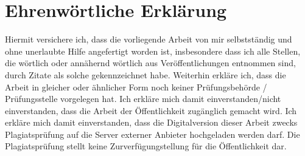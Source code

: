 \section*{Ehrenwörtliche Erklärung}
\thispagestyle{empty}

Hiermit versichere ich, dass die vorliegende Arbeit von mir selbstständig und
ohne unerlaubte Hilfe angefertigt worden ist, insbesondere dass ich alle Stellen, die wörtlich oder annähernd wörtlich aus Veröffentlichungen entnommen
sind, durch Zitate als solche gekennzeichnet habe. Weiterhin erkläre ich,
dass die Arbeit in gleicher oder ähnlicher Form noch keiner Prüfungsbehörde
/ Prüfungsstelle vorgelegen hat. Ich erkläre mich damit einverstanden/nicht
einverstanden, dass die Arbeit der Öffentlichkeit zugänglich gemacht wird.
Ich erkläre mich damit einverstanden, dass die Digitalversion dieser Arbeit
zwecks Plagiatsprüfung auf die Server externer Anbieter hochgeladen werden darf.
Die Plagiatsprüfung stellt keine Zurverfügungstellung für die Öffentlichkeit dar.

\AffidavitSignature[
	location=Ort,
	date=Datum,
]